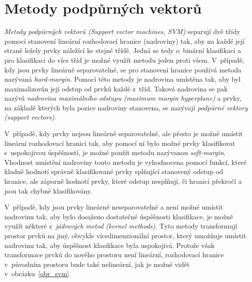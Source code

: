 \section{Metody podpůrných vektorů}
\label{metody_podpurnych_vektoru}
\textit{Metody podpůrných vektorů (Support vector machines, SVM)} separují dvě třídy pomocí stanovení lineární rozhodovací hranice (nadroviny) tak, aby na každé její straně ležely prvky náležící ke stejné třídě. Jedná se tedy o~binární klasifikaci a pro klasifikaci do více tříd je možné využít metodu jeden proti všem. V~případě, kdy jsou prvky lineárně separovatelné, se pro stanovení hranice používá metoda nazývaná \textit{hard-margin}. Pomocí této metody je nadrovina umístěna tak, aby byl maximalizován její odstup od prvků každé z~tříd. Taková nadrovina se pak nazývá \textit{nadrovina maximálního odstupu (maximum margin hyperplane)} a prvky, na základě kterých byla pozice nadroviny stanovena, se nazývají \textit{podpůrné vektory (support vectors)}.\cite{data_classification}\cite{understanding_machine_learning}

V~případě, kdy prvky nejsou lineárně separovatelné, ale přesto je možné umístit lineární rozhodovací hranici tak, aby pomocí ní bylo možné prvky klasifikovat s~uspokojivou úspěšností, je možné použít metodu nazývanou \textit{soft-margin}. Vhodnost umístění nadroviny touto metodu je vyhodnocena pomocí funkcí, které kladně hodnotí správně klasifikované prvky splňující stanovený odstup od hranice, ale záporně hodnotí prvky, které odstup nesplňují, či hranici překročí a jsou tak chybně klasifikovány.

V~případě, kdy jsou prvky lineárně neseparovatelné a není možné umístit nadrovinu tak, aby bylo dosaženo dostatečné úspěšnosti klasifikace, je možné využít některé z~\textit{jádrových metod (kernel methods)}. Tyto metody transformují prostor prvků na jiný, obvykle vícedimenzionální prostor, který umožňuje umístit nadrovinu tak, aby úspěšnost klasifikace byla uspokojivá. Protože však transformace prvků do nového prostoru není lineární, rozhodovací hranice v~původním prostoru bude také nelineární, jak je možné vidět v~obrázku~\ref{obr_svm}.

